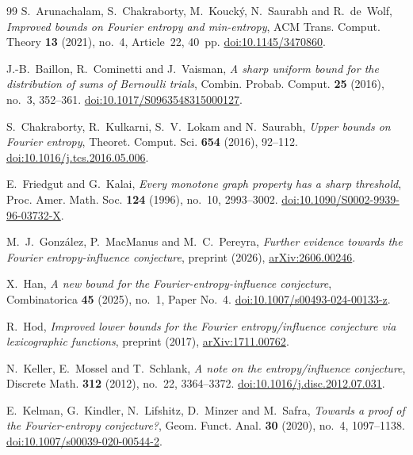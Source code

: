 \documentclass[11pt]{amsart}
\theoremstyle{definition}
\theoremstyle{remark}
\begin{document}
\begin{thebibliography}{99}
S.~Arunachalam, S.~Chakraborty, M.~Kouck\'y, N.~Saurabh and R.~de~Wolf,
\emph{Improved bounds on Fourier entropy and min-entropy},
ACM Trans. Comput. Theory \textbf{13} (2021), no.~4, Article~22, 40~pp.
\href{https://doi.org/10.1145/3470860}{doi:10.1145/3470860}.

J.-B.~Baillon, R.~Cominetti and J.~Vaisman,
\emph{A sharp uniform bound for the distribution of sums of Bernoulli trials},
Combin. Probab. Comput. \textbf{25} (2016), no.~3, 352--361.
\href{https://doi.org/10.1017/S0963548315000127}{doi:10.1017/S0963548315000127}.

S.~Chakraborty, R.~Kulkarni, S.~V.~Lokam and N.~Saurabh,
\emph{Upper bounds on Fourier entropy},
Theoret. Comput. Sci. \textbf{654} (2016), 92--112.
\href{https://doi.org/10.1016/j.tcs.2016.05.006}{doi:10.1016/j.tcs.2016.05.006}.

E.~Friedgut and G.~Kalai,
\emph{Every monotone graph property has a sharp threshold},
Proc. Amer. Math. Soc. \textbf{124} (1996), no.~10, 2993--3002.
\href{https://doi.org/10.1090/S0002-9939-96-03732-X}{doi:10.1090/S0002-9939-96-03732-X}.

M.~J.~Gonz\'alez, P.~MacManus and M.~C.~Pereyra,
\emph{Further evidence towards the Fourier entropy-influence conjecture},
preprint (2026), \href{https://arxiv.org/abs/2606.00246}{arXiv:2606.00246}.

X.~Han,
\emph{A new bound for the Fourier-entropy-influence conjecture},
Combinatorica \textbf{45} (2025), no.~1, Paper No.~4.
\href{https://doi.org/10.1007/s00493-024-00133-z}{doi:10.1007/s00493-024-00133-z}.

R.~Hod,
\emph{Improved lower bounds for the Fourier entropy/influence conjecture via lexicographic functions},
preprint (2017), \href{https://arxiv.org/abs/1711.00762}{arXiv:1711.00762}.

N.~Keller, E.~Mossel and T.~Schlank,
\emph{A note on the entropy/influence conjecture},
Discrete Math. \textbf{312} (2012), no.~22, 3364--3372.
\href{https://doi.org/10.1016/j.disc.2012.07.031}{doi:10.1016/j.disc.2012.07.031}.

E.~Kelman, G.~Kindler, N.~Lifshitz, D.~Minzer and M.~Safra,
\emph{Towards a proof of the Fourier-entropy conjecture?},
Geom. Funct. Anal. \textbf{30} (2020), no.~4, 1097--1138.
\href{https://doi.org/10.1007/s00039-020-00544-2}{doi:10.1007/s00039-020-00544-2}.


\end{thebibliography}
\end{document}
